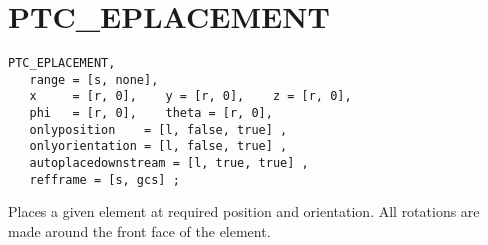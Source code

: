 
\section{PTC\_EPLACEMENT}

\begin{verbatim}
PTC_EPLACEMENT, 
   range = [s, none],
   x     = [r, 0],    y = [r, 0],    z = [r, 0],
   phi   = [r, 0],    theta = [r, 0], 
   onlyposition    = [l, false, true] ,
   onlyorientation = [l, false, true] ,
   autoplacedownstream = [l, true, true] ,
   refframe = [s, gcs] ; 
\end{verbatim}


Places a given element at required position and orientation.  All
rotations are made around the front face of the element.

